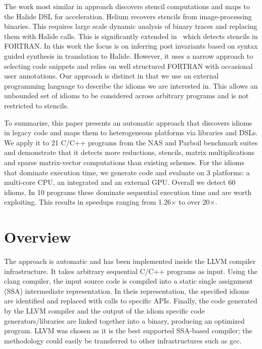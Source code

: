     The work most similar in approach discovers stencil computations and maps to
    the Halide DSL for acceleration.
    Helium \cite{Mendis2015Helium} recovers stencils from image-processing
    binaries.
    This requires large scale dynamic analysis of binary traces and replacing
    them with Halide calls. 
    This is significantly extended in~\cite{Kamil2016Verified} which detects
    stencils in FORTRAN.
    In this work the focus is on inferring post invariants based on syntax
    guided synthesis in translation to Halide.
    However, it uses a narrow approach to selecting code snippets and relies on
    well structured FORTRAN with occasional user annotations.
    Our approach is distinct in that we use an external  programming language to
    describe the idioms we are interested in.
    This allows an unbounded set of idioms  to be considered across arbitrary
    programs and is not restricted to stencils. 

    To summarize, this paper presents an automatic approach that discovers
    idioms in legacy code and maps them to heterogeneous platforms via libraries
    and DSLs.
    We apply it to 21 C/C++ programs from the NAS and Parboil benchmark suites
    and demonstrate that it detects more reductions, stencils, matrix
    multiplications and sparse matrix-vector computations than existing schemes.
    For the idioms that dominate execution time, we generate code and evaluate
    on 3 platforms: a multi-core CPU, an integrated and an external GPU.
    Overall we detect 60 idioms.
    In 10 programs these dominate sequential execution time and are worth
    exploiting.
    This results in speedups ranging from 1.26$\times$ to over 20$\times$.

\section{Overview}

    The approach is automatic and has been implemented inside the LLVM compiler
    infrastructure.
    It takes arbitrary sequential C/C++ programs as input.
    Using the clang compiler, the input source code is compiled into a static
    single assignment (SSA) intermediate representation.
    In theis representation, the specified idioms are identified and replaced
    with calls to specific APIs.
    Finally, the code generated by the LLVM compiler and the output of the idiom
    specific code generators/libraries are linked together into a binary,
    producing an optimized program.
    LLVM was chosen as it is the best supported SSA-based compiler;
    the methodology could easily be transferred to other infrastructures such as
    gcc.

